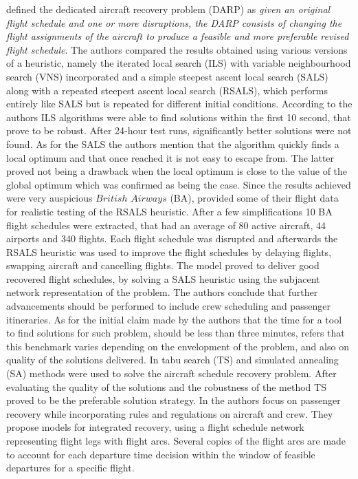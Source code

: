 \documentclass[ijoo,nonblindrev]{informs-ijoo}
\begin{document}
\citep{Love2001} defined the dedicated aircraft recovery problem (DARP) as \textit{given an original flight schedule and one or more disruptions, the DARP consists of changing  the flight assignments of the aircraft to produce a feasible and more preferable revised flight schedule}. The authors compared the results obtained using various versions of a heuristic, namely the iterated local search (ILS) with variable neighbourhood search (VNS) incorporated and a simple steepest ascent local search (SALS) along with a repeated steepest ascent local search (RSALS), which performs entirely like SALS but is repeated for different initial conditions. According to the authors ILS algorithms were able to find solutions within the first 10 second, that prove to be robust. After 24-hour test runs, significantly better solutions were not found. As for the SALS the authors mention that the algorithm quickly finds a local optimum and that once reached it is not easy to escape from. The latter proved not being a drawback when the local optimum is close to the value of the global optimum which was confirmed as being the case. Since the results achieved were very auspicious $British$ $Airways$ (BA), provided some of their flight data for realistic testing of the RSALS heuristic. After a few simplifications 10 BA flight schedules were extracted, that had an average of 80 active aircraft, 44 airports and 340 flights. Each flight schedule was disrupted and afterwards the RSALS heuristic was used to improve the flight schedules by delaying flights, swapping aircraft and cancelling flights.  The model proved to deliver good recovered flight schedules, by solving a SALS heuristic using the subjacent network representation of the problem. The authors conclude that further advancements should be performed to include crew scheduling and passenger itineraries.   As for the initial claim made by the authors that the time for a tool to find solutions for such problem, should be less than three minutes, \citep{Andersson:2006} refers that this benchmark varies depending on the envelopment of the problem, and also on quality of the solutions delivered.
In \citep{Andersson:2006} tabu search (TS) and simulated annealing (SA) methods were used to solve the aircraft schedule recovery problem. After evaluating the quality of the solutions and the robustness of the method TS proved to be the preferable solution strategy.
In \citep{Bratu2006} the authors focus on passenger recovery while incorporating rules and regulations on aircraft and crew. They propose models for integrated recovery, using a flight schedule network representing flight legs with flight arcs. Several copies of the flight arcs are made to account for each departure time decision within the window of feasible departures for a specific flight.\\
\end{document}
